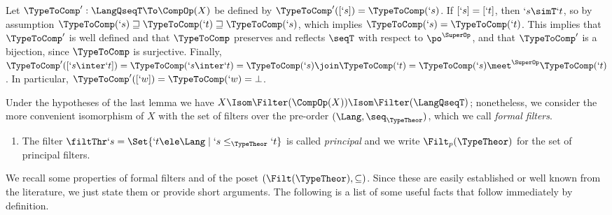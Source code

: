\documentclass{lmcs}
\begin{document}
 \begin{Proof}
Let $ \TypeToComp': \LangQseqT \To \CompOp(X)$ be defined by $ \TypeToComp'([`s]) = \TypeToComp(`s)$.
If $[`s] = [`t]$, then $`s \simT `t$, so by assumption $ \TypeToComp(`s) \sqsupseteq \TypeToComp(`t) \sqsupseteq \TypeToComp(`s)$, which implies $ \TypeToComp(`s) = \TypeToComp(`t)$. 
This implies that $ \TypeToComp'$ is well defined and that $\TypeToComp$ preserves and reflects $\seqT$ with respect to $ \po^{\SuperOp}$, and that $\TypeToComp'$ is a bijection, since $ \TypeToComp$ is surjective. 
Finally, $ \TypeToComp'([`s \inter `t]) = \TypeToComp(`s \inter `t) = \TypeToComp(`s) \join \TypeToComp(`t) = \TypeToComp(`s) \meet^{\SuperOp} \TypeToComp(`t)$. 
In particular, $ \TypeToComp'([`w]) = \TypeToComp(`w) = \bot$.
 \end{Proof}


Under the hypotheses of the last lemma we have $X \Isom \Filter(\CompOp(X)) \Isom \Filter(\LangQseqT)$; nonetheless, we consider the more convenient isomorphism of $X$ with the set of filters over the pre-order $(\Lang,\seq_{\TypeTheor})$, which we call \emph{formal filters}.

 \begin{defi} \label{def:formal-filt}
 \begin{enumerate}

 \firstitem
A \emph{formal filter} with respect to an intersection type theory $\TypeTheor$ over $\Lang$ is a subset $f\subseteq\Lang$ such that:
%
 \[ \begin{array}{c@{\dquad}c@{\dquad}c} 
\Inf{`w \ele f} &
\Inf{`s \ele f \quad `s \seqT`t }{`t \ele f} &
\Inf{`s \ele f \quad `t \ele f }{`s \inter `t \ele f}
 \end{array} \]
%
$\Filt(\TypeTheor)$ is the set of formal filters induced by the theory and we let $f,g$ range over $\Filt(\TypeTheor)$.

 \item 
The filter $ \filtThr `s = \Set{`t \ele \Lang \mid `s \le_{\TypeTheor} `t}$ is called \emph{principal} and we write $\Filt_p(\TypeTheor)$ for the set of principal filters.

 \end{enumerate}
 \end{defi}

We recall some properties of formal filters and of the poset $(\Filt(\TypeTheor),\subseteq)$. 
Since these are easily established or well known from the literature, we just state them or provide short arguments. 
The following is a list of some useful facts that follow immediately by definition. 
\end{document}

